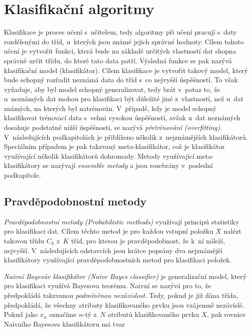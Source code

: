 \chapter{Klasifikační algoritmy}
\label{klasifikacni_algoritmy}
Klasifikace je proces učení s~učitelem, tedy algoritmy při učení pracují s~daty rozdělenými do tříd, u~kterých jsou známé jejich správné hodnoty. Cílem tohoto učení je vytvořit funkci, která bude na základě určitých vlastností dat shopna správně určit třídu, do které tato data patří. Výsledná funkce se pak nazývá klasifikační model (klasifikátor). Cílem klasifikace je vytvořit takový model, který bude schopný rozřadit neznámá data do tříd s~co nejvyšší úspěšností. To však vyžaduje, aby byl model schopný generalizovat, tedy brát v~potaz to, že u~neznámých dat mohou pro klasifikaci být důležité jiné z~vlastností, než u~dat známých, na kterých byl natrénován. V~případě, kdy je model schopný klasifikovat trénovací data s~velmi vysokou úspěšností, avšak u~dat neznámých dosahuje podstatně nižší úspěšnosti, se nazývá \textit{přetrénování (overfitting)}. V~následujících podkapitolách je přiblíženo několik z~nejznámějších klasifikátorů. Speciálním případem je pak takzvaný meta-klasifikátor, což je klasifikátor využívající několik klasifikátorů dohromady. Metody využívající meta-klasifikátory se nazývají \textit{ensemble metody} a jsou rozebrány v~poslední podkapitole.\cite{data_classification}

\section{Pravděpodobnostní metody}
\label{pravdepodobnostni_metody}
\textit{Pravděpodobnostní metody (Probabilistic methods)} využívají principů statistiky pro klasifikaci dat. Cílem těchto metod je pro každou vstupní položku $X$ nalézt takovou třídu $C_k$ z~$K$ tříd, pro kterou je pravděpodobnost, že k~ní náleží, nejvyšší. V~následujících odstavcích jsou krátce popsány dva nejznámější klasifikátory využívající pravděpodobnostních metod pro klasifikaci položek.\cite{data_classification}

\textit{Naivní Bayesův klasifikátor (Naive Bayes classifier)} je generalizační model, který pro klasifikaci využívá Bayesova teorému. Naivní se nazývá pro to, že předpokládá takzvanou \textit{podmíněnou nezávislost}. Tedy, pokud je již dána třída, předpokládá, že všechny atributy klasifikovaného prvku jsou vzájemně nezávislé. Pokud jako $x_n$ označíme $n$-tý z~$N$ atributů klasifikovaného prvku $X$, pak rovnice Naivního Bayesova klasifikátoru má tvar

